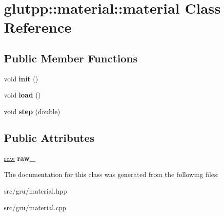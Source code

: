 \hypertarget{classglutpp_1_1material_1_1material}{\section{glutpp\-:\-:material\-:\-:material \-Class \-Reference}
\label{classglutpp_1_1material_1_1material}
}
\subsection*{\-Public \-Member \-Functions}
\begin{DoxyCompactItemize}
\item 
\hypertarget{classglutpp_1_1material_1_1material_a5610c4dc9129ecc5fa6b28814fcf147e}{void {\bfseries init} ()}\label{classglutpp_1_1material_1_1material_a5610c4dc9129ecc5fa6b28814fcf147e}

\item 
\hypertarget{classglutpp_1_1material_1_1material_a70897de59b78a8fbd8ddf85e92385e98}{void {\bfseries load} ()}\label{classglutpp_1_1material_1_1material_a70897de59b78a8fbd8ddf85e92385e98}

\item 
\hypertarget{classglutpp_1_1material_1_1material_ae2b179fde85146dc1d8b0ca98e92cb7e}{void {\bfseries step} (double)}\label{classglutpp_1_1material_1_1material_ae2b179fde85146dc1d8b0ca98e92cb7e}

\end{DoxyCompactItemize}
\subsection*{\-Public \-Attributes}
\begin{DoxyCompactItemize}
\item 
\hypertarget{classglutpp_1_1material_1_1material_a345a3b15781a4e72450ce0fac04d7b88}{\hyperlink{structglutpp_1_1material_1_1raw}{raw} {\bfseries raw\-\_\-}}\label{classglutpp_1_1material_1_1material_a345a3b15781a4e72450ce0fac04d7b88}

\end{DoxyCompactItemize}


\-The documentation for this class was generated from the following files\-:\begin{DoxyCompactItemize}
\item 
src/gru/material.\-hpp\item 
src/gru/material.\-cpp\end{DoxyCompactItemize}
